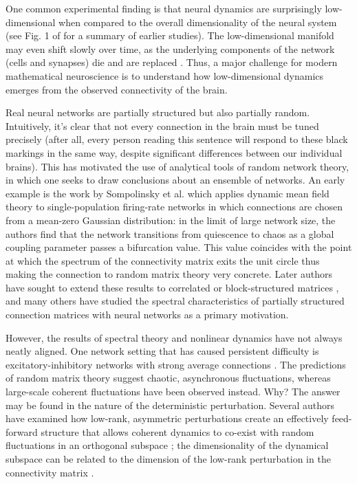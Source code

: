 \documentclass[reqno]{siamonline190516}
\begin{document}
    One common experimental finding is that neural dynamics are surprisingly low-dimensional when compared to the overall dimensionality of the neural system \cite{ecker14,Chai_etal_Neuron_2017,Gallego_NatCom_2018,Wang_etal_NatNeuro_2018,huang2019circuit} (see Fig. 1 of \cite{Gao_CON_2015} for a summary of earlier studies). The low-dimensional manifold may even shift slowly over time, as the underlying components of the network (cells and synapses) die and are replaced \cite{gallego2020long}. Thus, a major challenge for modern mathematical neuroscience is to understand how low-dimensional dynamics emerges from the observed connectivity of the brain.
    
    Real neural networks are partially structured but also partially random. Intuitively, it’s clear that not every connection in the brain must be tuned precisely (after all, every person reading this sentence will respond to these black markings in the same way, despite significant differences between our individual brains). This has motivated the use of analytical tools of random network theory, in which one seeks to draw conclusions about an ensemble of networks. An early example is the work by Sompolinsky et al. \cite{SompCris88} which applies dynamic mean field theory to single-population firing-rate networks in which connections are chosen from a mean-zero Gaussian distribution: in the limit of large network size, the authors find that the network transitions from quiescence to chaos as a global coupling parameter passes a bifurcation value. This value coincides with the point at which the spectrum of the connectivity matrix exits the unit circle \cite{girko85,bai97} thus making the connection to random matrix theory very concrete. Later authors have sought to extend these results to correlated or block-structured matrices \cite{kadmon_HS_2015,Aljadeff_2015}, and many others have studied the spectral characteristics of partially structured connection matrices \cite{Wei12, Ahmadian_etal_2015, muir_MF_2015} with neural networks as a primary motivation.
    
    However, the results of spectral theory and nonlinear dynamics have not always neatly aligned. One network setting that has caused persistent difficulty is excitatory-inhibitory networks with strong average connections \cite{RA06}. The predictions of random matrix theory suggest chaotic, asynchronous fluctuations, whereas large-scale coherent fluctuations have been observed instead. Why? The answer may be found in the nature of the deterministic perturbation. Several authors have examined how low-rank, asymmetric perturbations create an effectively feed-forward structure that allows coherent dynamics to co-exist with random fluctuations in an orthogonal subspace \cite{delMolino_etal_PRE_2013, Darshan_etal_PRX_2018, Landau_HS_PCB_2018,Landau_HS_PRR_2021}; the dimensionality of the dynamical subspace can be related to the dimension of the low-rank perturbation in the connectivity matrix \cite{Schuessler_etal_PRR_2020,beiran2021shaping}.  
    
\end{document}
